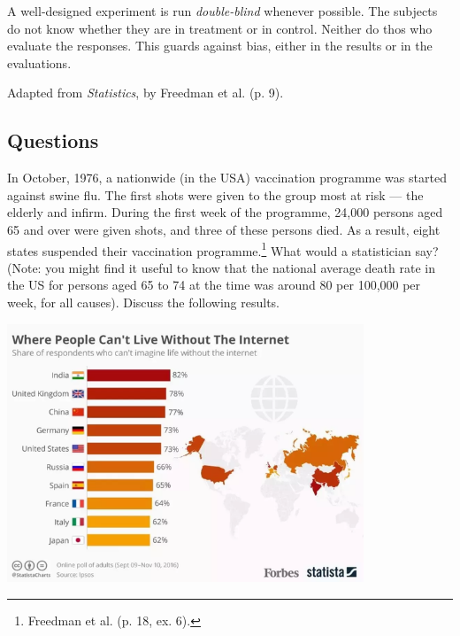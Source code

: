A well-designed experiment is run \emph{double-blind} whenever possible. The subjects do not know whether they are in treatment or in control.
Neither do thos who evaluate the responses. This guards against bias, either in the results or in the evaluations.

\begin{flushright}
  Adapted from \textit{Statistics}, by Freedman et al. (p. 9).
\end{flushright}


\clearpage
\subsection*{Questions}
\begin{questions}
  \question In October, 1976, a nationwide (in the USA) vaccination programme was started against swine flu. The first shots were given to the group
            most at risk --- the elderly and infirm. During the first week of the programme, 24,000 persons aged 65 and over were given shots,
            and three of these persons died. As a result, eight states suspended their vaccination programme.\footnote{Freedman et al. (p. 18, ex. 6).}
            What would a statistician say? (Note: you might find it useful to know that the national average death rate in the US for persons aged 65
            to 74 at the time was around 80 per 100,000 per week, for all causes).
  \question Discuss the following results.
            \begin{center}
              \includegraphics[width=0.8\textwidth]{badsurvey}
            \end{center}
\end{questions}

